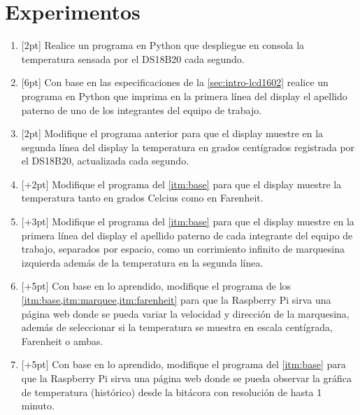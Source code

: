 %
%



\section{Experimentos}%
\label{sec:experiments}

\begin{enumerate}
	\item{} [2pt] Realice un programa en Python que despliegue en consola la temperatura sensada por el DS18B20 cada segundo.

	\item{} [6pt] Con base en las especificaciones de la \cref{sec:intro-lcd1602} realice un programa en Python que imprima en la primera línea del display el apellido paterno de uno de los integrantes del equipo de trabajo.

	\item{} [2pt] Modifique el programa anterior para que el display muestre en la segunda línea del display la temperatura en grados centígrados registrada por el DS18B20, actualizada cada segundo.%
	\label{itm:base}

	\item{} [+2pt] Modifique el programa del \cref{itm:base} para que el display muestre la temperatura tanto en grados Celcius como en Farenheit.%
	\label{itm:farenheit}

	\item{} [+3pt] Modifique el programa del \cref{itm:base} para que el display muestre en la primera línea del display el apellido paterno de cada integrante del equipo de trabajo, separados por espacio, como un corrimiento infinito de marquesina izquierda además de la temperatura en la segunda línea.%
	\label{itm:marquee}

	\item{} [+5pt] Con base en lo aprendido, modifique el programa de los \cref{itm:base,itm:marquee,itm:farenheit} para que la Raspberry Pi sirva una página web donde se pueda variar la velocidad y dirección de la marquesina, además de seleccionar si la temperatura se muestra en escala centígrada, Farenheit o ambas.

	\item{} [+5pt] Con base en lo aprendido, modifique el programa del \cref{itm:base} para que la Raspberry Pi sirva una página web donde se pueda observar la gráfica de temperatura (histórico) desde la bitácora con resolución de hasta 1 minuto.
\end{enumerate}
